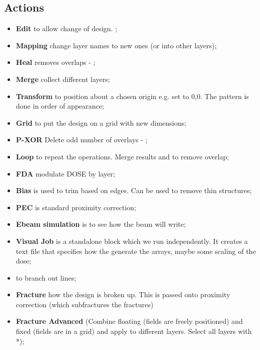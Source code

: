 \subsection{Actions}
\begin{itemize}
\item \textbf{Edit} to allow change of  design. ;
\item \textbf{Mapping} change layer names to new ones (or into other layers);
\item \textbf{Heal} removes overlaps - ;
\item \textbf{Merge} collect different layers;
\item \textbf{Transform} to  position about a chosen  origin e.g. set   to 0,0. The
  pattern is done in order of appearance;
\item \textbf{Grid} to put the design on a grid with new dimensions;
\item \textbf{P-XOR}  Delete odd  number of overlays  - ;
\item \textbf{Loop} to repeat the operations.  Merge results and  to remove overlap;
\item \textbf{FDA} modulate DOSE by layer;
\item \textbf{Bias} is used to trim based on edges. Can be used to remove thin structures;
\item \textbf{PEC} is standard proximity correction;
\item \textbf{Ebeam simulation} is to see how the beam will write;
\item \textbf{Visual Job} is a standalone block which we run independently.  It creates a text
  file that specifies how the generate the arrays, maybe some scaling of the dose;
\item  {}  to branch  out lines;  
\item \textbf{Fracture} how the design is broken up.  This is passed onto proximity correction
  (which subfractures the fractures)
\item  \textbf{Fracture  \iRa Advanced}  \ira  (\ec Combine  floating
  (fields are  freely positioned)  and fixed  (fields are in  a grid)  and apply  to different
  layers. Select all layers with *);
\end{itemize}
